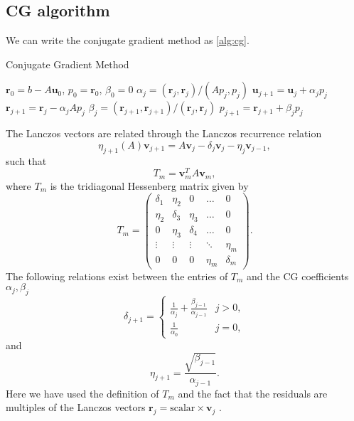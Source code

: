 \subsection{CG algorithm}
We can write the conjugate gradient method as \cref{alg:cg}.
\begin{algorithm}[H]
  \caption{Conjugate Gradient Method \cite[Algorithm 6.18]{iter_method_saad}}
  \begin{algorithmic}
    \State $\mathbf{r}_0 = b - A\mathbf{u}_0$, $p_0 = \mathbf{r}_0$, $\beta_0 = 0$
    \State $\alpha_j = (\mathbf{r}_j, \mathbf{r}_j) / (A p_j, p_j)$
    \State $\mathbf{u}_{j+1} = \mathbf{u}_j + \alpha_j p_j$
    \State $\mathbf{r}_{j+1} = \mathbf{r}_j - \alpha_j A p_j$
    \State $\beta_j = (\mathbf{r}_{j+1}, \mathbf{r}_{j+1}) / (\mathbf{r}_j, \mathbf{r}_j)$
    \State $p_{j+1} = \mathbf{r}_{j+1} + \beta_j p_j$
    \EndFor
  \end{algorithmic}
  \label{alg:cg}
\end{algorithm}
The Lanczos vectors are related through the Lanczos recurrence relation
\begin{equation}
  \label{eq:lanczos_recurrence}
  \eta_{j+1}(A)\mathbf{v}_{j+1} = A \mathbf{v}_j - \delta_j \mathbf{v}_j - \eta_j \mathbf{v}_{j-1},
\end{equation}
such that
\[
  T_m = \mathbf{v}_m^T A \mathbf{v}_m,
\]
where $T_m$ is the tridiagonal Hessenberg matrix given by
\begin{equation}
  T_m =
  \begin{pmatrix}
    \delta_1 & \eta_2   & 0        & \dots  & 0        \\
    \eta_2   & \delta_3 & \eta_3   & \dots  & 0        \\
    0        & \eta_3   & \delta_4 & \dots  & 0        \\
    \vdots   & \vdots   & \vdots   & \ddots & \eta_m   \\
    0        & 0        & 0        & \eta_m & \delta_m
  \end{pmatrix}.
  \label{eq:lanczos_tridiagonal}
\end{equation}
The following relations exist between the entries of $T_m$ and the CG coefficients $\alpha_j, \beta_j$
\begin{equation}
  \delta_{j+1} =
  \begin{cases}
    \frac{1}{\alpha_j} + \frac{\beta_{j-1}}{\alpha_{j-1}} & j > 0, \\
    \frac{1}{\alpha_0}                                    & j = 0,
  \end{cases}
  \label{eq:cg_hessenberg_delta}
\end{equation}
and
\begin{equation}
  \eta_{j+1} = \frac{\sqrt{\beta_{j-1}}}{\alpha_{j-1}}.
  \label{eq:cg_hessenberg_eta}
\end{equation}
Here we have used the definition of $T_m$ and the fact that the residuals are multiples of the Lanczos vectors $\mathbf{r}_j = \text{scalar} \times \mathbf{v}_j$ \cite[Equation 6.103]{iter_method_saad}.

